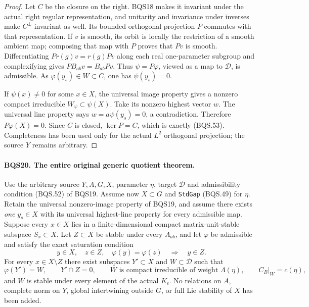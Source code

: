 \documentclass[11pt,a4paper]{article}
\numberwithin{equation}{section}
\theoremstyle{remark}\newtheorem{remark}[theorem]{Remark}
\begin{document}
\begin{proof}
Let $C$ be the closure on the right.  BQS18 makes it invariant
under the actual right regular representation, and unitarity and
invariance under inverses make $C^\perp$ invariant as well.
Its bounded orthogonal projection $P$ commutes with that representation.
If $v$ is smooth, its orbit is locally the restriction of a smooth
ambient map; composing that map with $P$ proves that $Pv$ is smooth.
Differentiating $P r(g)v=r(g)Pv$ along each real one-parameter
subgroup and complexifying gives $PB_{ab}v=B_{ab}Pv$.
Thus $\psi=P\varphi$, viewed as a map to $\mathcal D$, is admissible.
As $\varphi(y_s)\in W\subset C$, one has $\psi(y_s)=0$.

If $\psi(x)\ne0$ for some $x\in X$, the universal image property
gives a nonzero compact irreducible $W_\psi\subset\psi(X)$.
Take its nonzero highest vector $w$.
The universal line property says $w=a\psi(y_s)=0$, a contradiction.
Therefore $P\varphi(X)=0$.  Since $C$ is closed, $\ker P=C$,
which is exactly (BQS.53).
Completeness has been used only for the actual $L^2$ orthogonal
projection; the source $Y$ remains arbitrary.
\end{proof}

\paragraph{BQS20. The entire original generic quotient theorem.}
\label{claim:BQS20}
Use the arbitrary source $Y,A,G,X$, parameter $\eta$, target
$\mathcal D$ and admissibility condition (BQS.52) of BQS19.
Assume now $X\subset G$ and \texttt{Std\allowbreak Gap} (BQS.49) for $\eta$.
Retain the universal nonzero-image property of BQS19, and assume
there exists \emph{one} $y_s\in X$ with its universal highest-line
property for every admissible map.
Suppose every $x\in X$ lies in a finite-dimensional compact
matrix-unit-stable subspace $S_x\subset X$.
Let $Z\subset X$ be stable under every $A_{ab}$, and let $\varphi$
be admissible and satisfy the exact saturation condition
\[
 y\in X,\quad z\in Z,\quad \varphi(y)=\varphi(z)
                       \quad\Longrightarrow\quad y\in Z.
 \tag{BQS.54}
\]
For every $x\in X\setminus Z$ there exist subspaces $Y'\subset X$
and $W\subset\mathcal D$ such that
\[
 \varphi(Y')=W,\qquad Y'\cap Z=0,\qquad
 W\text{ is compact irreducible of weight }\Lambda(\eta),
 \qquad C_B|_W=c(\eta),
 \tag{BQS.55}
\]
and $W$ is stable under every element of the actual $K_\epsilon$.
No relations on $A$, complete norm on $Y$, global intertwining
outside $G$, or full Lie stability of $X$ has been added.
\end{document}
